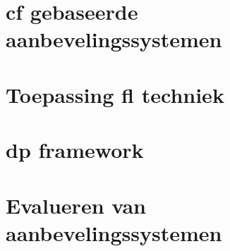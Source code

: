 \section{\ac{cf} gebaseerde aanbevelingssystemen}
\section{Toepassing \ac{fl} techniek}
\section{\ac{dp} framework}
\section{Evalueren van aanbevelingssystemen}




\lipsum[7-20]



